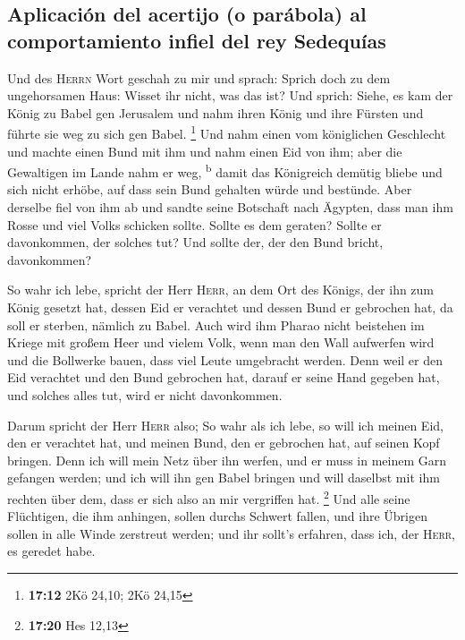 \hypertarget{aplicaciuxf3n-del-acertijo-o-paruxe1bola-al-comportamiento-infiel-del-rey-sedequuxedas}{%
\subsection{Aplicación del acertijo (o parábola) al comportamiento
infiel del rey
Sedequías}\label{aplicaciuxf3n-del-acertijo-o-paruxe1bola-al-comportamiento-infiel-del-rey-sedequuxedas}}

 Und des \textsc{Herrn} Wort geschah zu mir und sprach:
 Sprich doch zu dem ungehorsamen Haus: Wisset ihr nicht,
was das ist? Und sprich: Siehe, es kam der König zu Babel gen Jerusalem
und nahm ihren König und ihre Fürsten und führte sie weg zu sich gen
Babel. \footnote{\textbf{17:12} 2Kö 24,10; 2Kö 24,15} 
Und nahm einen vom königlichen Geschlecht und machte einen Bund mit ihm
und nahm einen Eid von ihm; aber die Gewaltigen im Lande nahm er weg,
\textsuperscript{b}  damit das Königreich demütig bliebe
und sich nicht erhöbe, auf dass sein Bund gehalten würde und bestünde.
 Aber derselbe fiel von ihm ab und sandte seine Botschaft
nach Ägypten, dass man ihm Rosse und viel Volks schicken sollte. Sollte
es dem geraten? Sollte er davonkommen, der solches tut? Und sollte der,
der den Bund bricht, davonkommen?

 So wahr ich lebe, spricht der Herr \textsc{Herr}, an dem
Ort des Königs, der ihn zum König gesetzt hat, dessen Eid er verachtet
und dessen Bund er gebrochen hat, da soll er sterben, nämlich zu Babel.
 Auch wird ihm Pharao nicht beistehen im Kriege mit
großem Heer und vielem Volk, wenn man den Wall aufwerfen wird und die
Bollwerke bauen, dass viel Leute umgebracht werden.  Denn
weil er den Eid verachtet und den Bund gebrochen hat, darauf er seine
Hand gegeben hat, und solches alles tut, wird er nicht davonkommen.

 Darum spricht der Herr \textsc{Herr} also; So wahr als
ich lebe, so will ich meinen Eid, den er verachtet hat, und meinen Bund,
den er gebrochen hat, auf seinen Kopf bringen.  Denn ich
will mein Netz über ihn werfen, und er muss in meinem Garn gefangen
werden; und ich will ihn gen Babel bringen und will daselbst mit ihm
rechten über dem, dass er sich also an mir vergriffen hat. \footnote{\textbf{17:20}
  Hes 12,13}  Und alle seine Flüchtigen, die ihm
anhingen, sollen durchs Schwert fallen, und ihre Übrigen sollen in alle
Winde zerstreut werden; und ihr sollt's erfahren, dass ich, der
\textsc{Herr}, es geredet habe.

